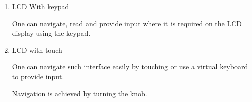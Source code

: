 \begin{enumerate}
    \item LCD With keypad 
    \par
    One can navigate, read and provide input where it is required on the LCD display using the keypad.
    \item LCD with touch 
    \par
    One can navigate such interface easily by touching or use a virtual keyboard to provide input. 
    \par
    Navigation is achieved by turning the knob. 
\end{enumerate}

